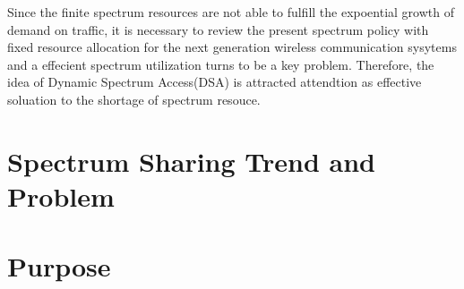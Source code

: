 Since the finite spectrum resources are not able to fulfill the expoential growth of demand on traffic, it is necessary to review the present spectrum policy with fixed resource allocation for the next generation wireless communication sysytems and a effecient spectrum utilization turns to be a key problem. 
Therefore, the idea of Dynamic Spectrum Access(DSA) is attracted attendtion as effective soluation to the shortage of spectrum resouce. 





\section{Spectrum Sharing Trend and Problem}

\section{Purpose}



